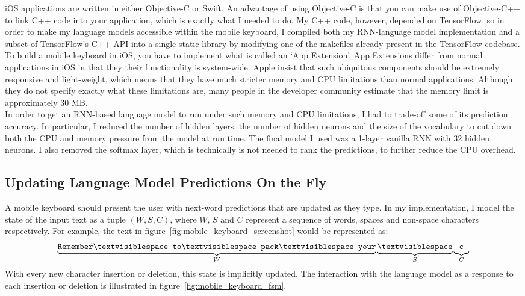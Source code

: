 \documentclass[a4paper, 12pt]{report}
\newcommand{\ttt}[1]{\texttt{#1}}
\begin{document}
iOS applications are written in either Objective-C or Swift. An advantage of using Objective-C is that you can make use of Objective-C++ to link C++ code into your application, which is exactly what I needed to do. My C++ code, however, depended on TensorFlow, so in order to make my language models accessible within the mobile keyboard, I compiled both my RNN-language model implementation and a subset of TensorFlow's C++ API into a single static library by modifying one of the makefiles already present in the TensorFlow codebase. \\

To build a mobile keyboard in iOS, you have to implement what is called an `App Extension'. App Extensions differ from normal applications in iOS in that they their functionality is system-wide. Apple insist that such ubiquitous components should be extremely responsive and light-weight, which means that they have much stricter memory and CPU limitations than normal applications. Although they do not specify exactly what these limitations are, many people in the developer community estimate that the memory limit is approximately 30 MB. \\

In order to get an RNN-based language model to run under such memory and CPU limitations, I had to trade-off some of its prediction accuracy. In particular, I reduced the number of hidden layers, the number of hidden neurons and the size of the vocabulary to cut down both the CPU and memory pressure from the model at run time. The final model I used was a 1-layer vanilla RNN with 32 hidden neurons. I also removed the softmax layer, which is technically is not needed to rank the predictions, to further reduce the CPU overhead.

\subsection{Updating Language Model Predictions On the Fly}

A mobile keyboard should present the user with next-word predictions that are updated as they type. In my implementation, I model the state of the input text as a tuple $(W, S, C)$, where $W$, $S$ and $C$ represent a sequence of words, spaces and non-space characters respectively. For example, the text in figure~\ref{fig:mobile_keyboard_screenshot} would be represented as:
\begin{gather*}
	\underbrace{\ttt{Remember\textvisiblespace to\textvisiblespace pack\textvisiblespace your}}_{\mathclap{W}}\underbrace{\vphantom{\ttt{pack}}\textvisiblespace}_{\mathclap{S}}\underbrace{\vphantom{\ttt{pack}}\ttt{c}}_{\mathclap{C}}
\end{gather*}
With every new character insertion or deletion, this state is implicitly updated. The interaction with the language model as a response to each insertion or deletion is illustrated in figure~\ref{fig:mobile_keyboard_fsm}. \\
\end{document}
